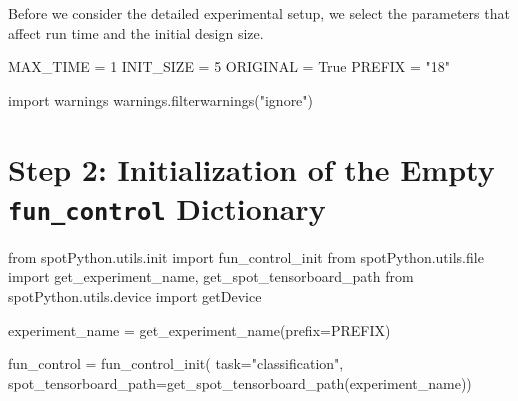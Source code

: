 \documentclass[
  letterpaper,
  DIV=11,
  numbers=noendperiod]{scrreprt}
\newenvironment{Shaded}{\begin{snugshade}}{\end{snugshade}}
\newcommand{\BuiltInTok}[1]{\textcolor[rgb]{0.00,0.23,0.31}{#1}}
\newcommand{\DecValTok}[1]{\textcolor[rgb]{0.68,0.00,0.00}{#1}}
\newcommand{\ImportTok}[1]{\textcolor[rgb]{0.00,0.46,0.62}{#1}}
\newcommand{\NormalTok}[1]{\textcolor[rgb]{0.00,0.23,0.31}{#1}}
\newcommand{\OperatorTok}[1]{\textcolor[rgb]{0.37,0.37,0.37}{#1}}
\newcommand{\StringTok}[1]{\textcolor[rgb]{0.13,0.47,0.30}{#1}}
\newcommand{\VariableTok}[1]{\textcolor[rgb]{0.07,0.07,0.07}{#1}}
\begin{document}
Before we consider the detailed experimental setup, we select the
parameters that affect run time and the initial design size.

\begin{Shaded}
\begin{Highlighting}[]
\NormalTok{MAX\_TIME }\OperatorTok{=} \DecValTok{1}
\NormalTok{INIT\_SIZE }\OperatorTok{=} \DecValTok{5}
\NormalTok{ORIGINAL }\OperatorTok{=} \VariableTok{True}
\NormalTok{PREFIX }\OperatorTok{=} \StringTok{"18"}
\end{Highlighting}
\end{Shaded}

\begin{Shaded}
\begin{Highlighting}[]
\ImportTok{import}\NormalTok{ warnings}
\NormalTok{warnings.filterwarnings(}\StringTok{"ignore"}\NormalTok{)}
\end{Highlighting}
\end{Shaded}

\hypertarget{step-2-initialization-of-the-empty-fun_control-dictionary-3}{%
\section{\texorpdfstring{Step 2: Initialization of the Empty
\texttt{fun\_control}
Dictionary}{Step 2: Initialization of the Empty fun\_control Dictionary}}\label{step-2-initialization-of-the-empty-fun_control-dictionary-3}}

\begin{Shaded}
\begin{Highlighting}[]
\ImportTok{from}\NormalTok{ spotPython.utils.init }\ImportTok{import}\NormalTok{ fun\_control\_init}
\ImportTok{from}\NormalTok{ spotPython.utils.}\BuiltInTok{file} \ImportTok{import}\NormalTok{ get\_experiment\_name, get\_spot\_tensorboard\_path}
\ImportTok{from}\NormalTok{ spotPython.utils.device }\ImportTok{import}\NormalTok{ getDevice}

\NormalTok{experiment\_name }\OperatorTok{=}\NormalTok{ get\_experiment\_name(prefix}\OperatorTok{=}\NormalTok{PREFIX)}

\NormalTok{fun\_control }\OperatorTok{=}\NormalTok{ fun\_control\_init(}
\NormalTok{    task}\OperatorTok{=}\StringTok{"classification"}\NormalTok{,}
\NormalTok{    spot\_tensorboard\_path}\OperatorTok{=}\NormalTok{get\_spot\_tensorboard\_path(experiment\_name))}
\end{Highlighting}
\end{Shaded}
\end{document}
